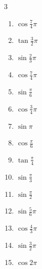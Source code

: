 \begin{multicols}{3}
\begin{enumerate}
  \item $\displaystyle \cos{\frac{7}{4}\pi}$

  \item $\displaystyle \tan{\frac{3}{2}\pi}$
        \phantom{$\displaystyle \quad なし$}

\columnbreak %

  \item $\displaystyle \sin{\frac{2}{3}\pi}$

  \item $\displaystyle \cos{\frac{7}{4}\pi}$

  \item $\displaystyle \sin{\frac{\pi}{6}}$

  \item $\displaystyle \cos{\frac{3}{4}\pi}$

  \item $\displaystyle \sin{\pi}$
        \phantom{$\displaystyle =0$}

  \item $\displaystyle \cos{\frac{\pi}{6}}$

  \item $\displaystyle \tan{\frac{\pi}{4}}$
        \phantom{$\displaystyle =1$}

  \item $\displaystyle \sin{\frac{\pi}{3}}$

  \item $\displaystyle \sin{\frac{\pi}{2}}$
        \phantom{$\displaystyle =1$}

  \item $\displaystyle \sin{\frac{5}{6}\pi}$

  \item $\displaystyle \cos{\frac{4}{3}\pi}$

  \item $\displaystyle \sin{\frac{3}{2}\pi}$
        \phantom{$\displaystyle =-1$}

  \item $\displaystyle \cos{2\pi}$
        \phantom{$\displaystyle =1$}


\end{enumerate}
\end{multicols}
